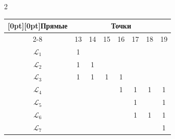 \begin{multicols}{2}
{\begin{center}
\vspace*{-3pt}


     \begin{tabular}{|c|c|c|c|c|c|c|c|}


\hline


\multicolumn{1}{|c|}{\raisebox{-6pt}[0pt][0pt]{Прямые}}


 & \multicolumn{7}{c|}{Точки} \\


                                \cline{2-8}


                        & 13  &  14 & 15  & 16  &  17 & 18  &  19 \\


\hline


$\mathcal{L}_1$ & 1  &   &   &   &  &  &  \\




$\mathcal{L}_2$ & 1  & 1  &   &   &  &  &  \\




$\mathcal{L}_3$ & 1  &  1 & 1   & 1  &  & &  \\




$\mathcal{L}_4$ &   &   &   & 1  & 1 & 1 & 1 \\




$\mathcal{L}_5$ &    &   &   &   & 1 &  & 1 \\




$\mathcal{L}_6$ &    &   &   &   & 1 & 1 & 1 \\




$\mathcal{L}_7$ &    &   &   &   &  &  & 1 \\


\hline


\end{tabular}


\end{center}


}







\vspace*{3pt}






\end{multicols}
